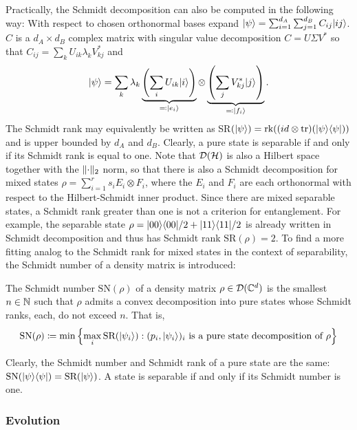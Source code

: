 Practically, the Schmidt decomposition can also be computed in the following way: With respect to chosen orthonormal bases expand $\lvert\psi\rangle = \sum_{i=1}^{d_A}\sum_{j=1}^{d_B}C_{ij}\lvert ij\rangle$. $C$ is a $d_A\times d_B$ complex matrix with singular value decomposition $C=U\Sigma V^*$ so that $C_{ij}=\sum_k U_{ik}\lambda_kV_{kj}^*$ and 
\begin{align}
    \lvert\psi\rangle = \sum_k \lambda_k \underbrace{\left(\sum_i U_{ik}\lvert i\rangle\right)}_{\eqqcolon \lvert e_i\rangle}\otimes \underbrace{\left(\sum_j V_{kj}^*\lvert j\rangle\right)}_{\eqqcolon \lvert f_i\rangle}.
\end{align}
The Schmidt rank may equivalently be written as SR$(\lvert\psi\rangle) = \text{rk}((id\otimes \mathrm{tr})(\lvert\psi\rangle\langle\psi\rvert))$ and is upper bounded by $d_A$ and $d_B$. Clearly, a pure state is separable if and only if its Schmidt rank is equal to one. Note that $\mathcal D(\mathcal{H})$ is also a Hilbert space together with the $\lVert\cdot\rVert _2$ norm, so that there is also a Schmidt decomposition for mixed states $\rho = \sum_{i=1}^r s_i E_i \otimes F_i$, where the $E_i$ and $F_i$ are each orthonormal with respect to the Hilbert-Schmidt inner product. Since there are mixed separable states, a Schmidt rank greater than one is not a criterion for entanglement. For example, the separable state $\rho =  \lvert00\rangle\langle00\rvert/2+\lvert11\rangle\langle11\rvert/2$ is already written in Schmidt decomposition and thus has Schmidt rank $\text{SR}(\rho) = 2$. To find a more fitting analog to the Schmidt rank for mixed states in the context of separability, the Schmidt number of a density matrix is introduced:
\begin{definition}
    The Schmidt number $\text{SN}(\rho)$ of a density matrix $\rho \in \mathcal D(\mathbb{C}^d)$ is the smallest $n\in \mathbb{N}$ such that $\rho$ admits a convex decomposition into pure states whose Schmidt ranks, each, do not exceed $n$. That is,
    \begin{align*}
        \text{SN}(\rho) \coloneqq \min\left\{\max_i \text{SR}(\lvert\psi_i\rangle) : (p_i, \lvert\psi_i\rangle)_i \text{ is a pure state decomposition of }\rho\right\}
    \end{align*}{}
\end{definition}
Clearly, the Schmidt number and Schmidt rank of a pure state are the same: $\text{SN}(\lvert\psi\rangle\langle\psi\rvert) = \text{SR}(\lvert\psi\rangle)$. A state is separable if and only if its Schmidt number is one.

\subsubsection{Evolution}






